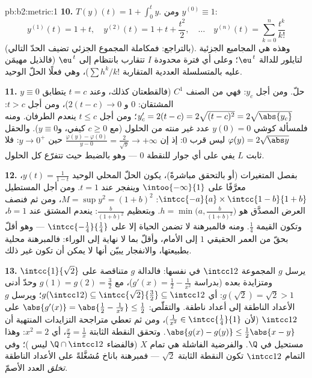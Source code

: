\begin{solution}{pb:b2:metric:1}
\textbf{10.} $T(y)(t) = 1 + \int_0^t y$. ومن $y^{(0)} \equiv
1$:
\[
y^{(1)}(t) = 1 + t,\quad
y^{(2)}(t) = 1 + t + \frac{t^2}2,\quad\dots\quad
y^{(n)}(t) = \sum_{k=0}^{n}\frac{t^k}{k!}
\]
(بالتراجع: فمكاملة المجموع الجزئي تضيف الحدّ التالي).
وهذه هي المجاميع الجزئية لتايلور للدالة $\eu^{\,t}$؛ وعلى أي فترة محدودة
$I$ تتقارب بانتظام إلى $\eu^{\,t}$ (فالذيل
مهيمَن عليه بالمتسلسلة العددية المتقاربة $\sum h^k/k!$)،
وهي فعلًا الحلّ الوحيد.

\textbf{11.} $y \equiv 0$ حلّ. ومن أجل $y_c$: فهي من الصنف $C^1$
(فالقطعتان كذلك، وعند $t = c$ يتطابق المشتقان: $0$ و
$2(t - c) \to 0$)، ومن أجل $t > c$: $y_c' = 2(t - c) =
2\sqrt{(t-c)^2} = 2\sqrt{\abs{y_c}}$؛ ومن أجل $t \leq c$ ينعدم الطرفان.
ومنه فلمسألة كوشي $y(0) = 0$ عدد غير منته من
الحلول (مع $c \geq 0$ كيفي، و$y \equiv 0$). والحقل
$\varphi(y) = 2\sqrt{\abs y}$ ليس  قرب $0$:
إذ إن $\frac{\varphi(y) - \varphi(0)}{y - 0} = \frac{2}{\sqrt y} \to
+\infty$ حين $y \to 0^+$: فلا ثابت $L$ يفي على أي
جوار للنقطة $0$ --- وهو بالضبط حيث تتفرّع كل
الحلول.

\textbf{12.} بفصل المتغيرات (أو بالتحقق مباشرةً)، يكون
الحلّ المحلي الوحيد $y(t) = \frac1{1 - t}$، معرَّفًا على
$\intoo{-\infty}{1}$ وينفجر عند $t = 1$. ومن أجل
المستطيل $\intcc{-a}{a} \times \intcc{1 - b}{1 + b}$: $M =
\sup y^2 = (1 + b)^2$، ومن ثم فنصف العرض المصدَّق هو $h =
\min\bigl(a, \frac{b}{(1+b)^2}\bigr)$. وبتعظيم
$\frac{b}{(1+b)^2}$: ينعدم المشتق عند $b = 1$، وتكون القيمة
$\frac14$. ومنه فالمبرهنة لا تضمن الحياة إلا على
$\intcc{-\frac14}{\frac14}$ --- وهو أقلّ بحقّ من العمر
الحقيقي $1$ إلى الأمام، وأقلّ بما لا نهاية إلى الوراء: فالمبرهنة
محلية بطبيعتها، والانفجار يبيّن أنها لا يمكن أن تكون غير ذلك.

\textbf{13.} يرسل $g$ المجموعة $\intcc12$ في نفسها: فالدالة $g$ متناقصة على
$\intcc{1}{\sqrt2}$ ومتزايدة بعده (بدراسة $g'(x) = \frac12
- \frac1{x^2}$)، مع $g(1) = g(2) = \frac32$ وحدّ أدنى
$g(\sqrt2) = \sqrt2 > 1$: أي $g(\intcc12) \subseteq
\intcc{\sqrt2}{\frac32} \subseteq \intcc12$؛ ويرسل $g$
الأعداد الناطقة إلى أعداد ناطقة. والتقلّص: $\abs{g'(x)} = \abs{\frac12
- \frac1{x^2}} \leq \frac12$ على $\intcc12$ (لأن $\frac1{x^2} \in
\intcc{\frac14}{1}$)، ومن ثم تعطي متراجحة التزايدات المنتهية
أن $\abs{g(x) - g(y)} \leq \frac12\abs{x - y}$. وتحقق النقطة الثابتة
$\frac x2 = \frac1x$، أي $x^2 = 2$: وهذا مستحيل في
$\Q$. والفرضية الفاشلة هي تمام $X$ (فالفضاء $\Q \cap
\intcc12$ ليس )؛ وفي التمام $\intcc12$ تكون
النقطة الثابتة $\sqrt2$ --- فمبرهنة باناخ مُشغَّلةً على
الأعداد الناطقة \emph{تخلق} العدد الأصمّ.


\end{solution}
